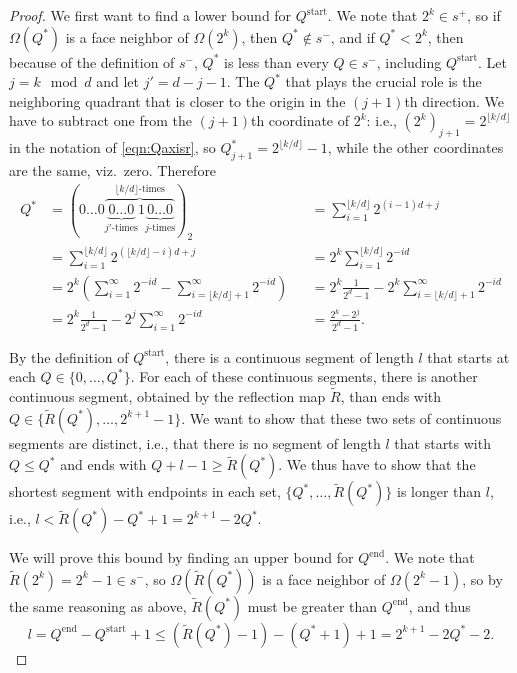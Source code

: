 \documentclass[a4paper,11pt]{article}
\newcommand{\spmod}{\!\mod}
\newcommand{\eqnlab}[1]{\label{eqn:#1}}
\newcommand{\eqnref}[1]{\eqref{eqn:#1}}
\begin{document}
\begin{proof}
  We first want to find a lower bound for $Q^{\text{start}}$.  We note that
  $2^k\in s^+$, so if $\Omega(Q^*)$ is a face neighbor of $\Omega(2^k)$, then
  $Q^*\not\in s^-$, and if $Q^* < 2^k$, then because of the definition of $s^-$,
  $Q^*$ is less than every $Q\in s^-$, including $Q^{\text{start}}$. 
  Let $j=k \spmod d$ and let $j'=d - j - 1$.
The $Q^*$ that plays the crucial role is the neighboring quadrant that is
  closer to the origin in
  the $(j+1)$th direction.  We have to subtract one from the $(j+1)$th
  coordinate of $2^k$: i.e., $(2^k)_{j+1}=2^{\lfloor k / d \rfloor}$ in the
  notation of \eqnref{Qaxisr}, so
  $Q^*_{j+1} =2^{\lfloor k / d \rfloor} - 1$, while the other coordinates are
  the same, viz.\ zero.  Therefore
\begin{equation}
    \begin{aligned}
      Q^*
      &= (0\dots0\overbrace{\underbrace{0\dots0}_{\text{$j'$-times}}1\underbrace{0\dots0}_{\text{$j$-times}}}^{\text{$\lfloor k / d\rfloor$-times}})_2
      & &= \sum_{i=1}^{\lfloor k / d \rfloor} 2^{(i-1)d + j} \\
      &= \sum_{i=1}^{\lfloor k / d \rfloor} 2^{(\lfloor  k / d \rfloor - i)d +
      j}
      & &= 2^k\sum_{i=1}^{\lfloor k / d \rfloor} 2^{-i d} \\
      &= 2^k\left(\sum_{i=1}^{\infty} 2^{-i d} - \sum_{i=\lfloor k /d \rfloor
        + 1}^{\infty} 2^{-id}\right)
      & &= 2^k\frac{1}{2^{d}-1} - 2^k
      \sum_{i=\lfloor k /d \rfloor + 1}^{\infty} 2^{-id} \\
      &= 2^k\frac{1}{2^{d}-1} - 2^j\sum_{i=1}^{\infty}
      2^{-id}
      & &= \frac{2^k - 2^j}{2^d-1}.
    \end{aligned}
  \end{equation}

  By the definition of $Q^\text{start}$, there is a continuous segment of
  length $l$ that starts at each $Q\in \{0,\dots, Q^*\}$.  For each of these
  continuous segments, there is another continuous segment, obtained by the
  reflection map $\tilde{R}$, than ends with
  $Q\in\{\tilde{R}(Q^*),\dots,2^{k+1}-1\}$.  We want to show that these two
  sets of continuous segments are distinct, i.e., that there is no segment of
  length $l$ that starts with $Q\leq Q^*$ and ends with $Q+l-1\geq
  \tilde{R}(Q^*)$.  We thus have to show that the shortest segment with
  endpoints in each set, $\{Q^*,\dots,\tilde{R}(Q^*)\}$ is longer than $l$,
  i.e., $l< \tilde{R}(Q^*) - Q^* + 1 = 2^{k+1} - 2Q^*$.

  We will prove this bound by finding an upper bound for $Q^{\text{end}}$.
  We note that $\tilde{R}(2^k)=2^k-1\in s^-$, so $\Omega(\tilde{R}(Q^*))$ is a face
  neighbor of $\Omega(2^k-1)$, so by the same reasoning as above,
  $\tilde{R}(Q^*)$ must be greater than $Q^{\text{end}}$, and thus
\begin{equation}\eqnlab{lbound}
    l = Q^{\text{end}} - Q^{\text{start}} + 1
    \leq (\tilde{R}(Q^*) - 1) - (Q^* + 1) + 1
    =
    2^{k+1} - 2Q^* - 2.
  \end{equation}


\end{proof}
\end{document}
